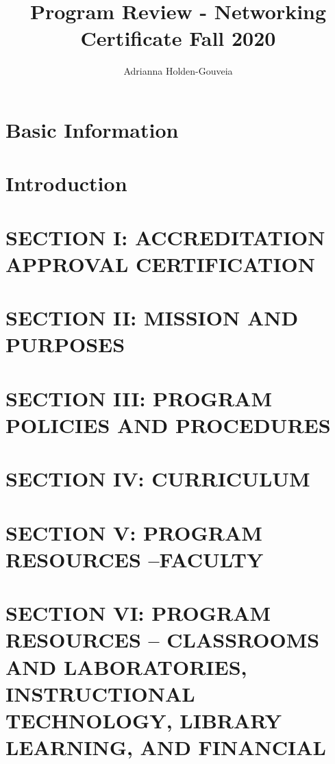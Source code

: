 \documentclass[12pt,a4paper,man,natbib,donotrepeattitle, book]{apa6}
\title{Program Review - Networking Certificate Fall 2020}
\author{Adrianna Holden-Gouveia}
\affiliation{Northern Essex Community College}
\begin{document}
\maketitle
\doublespacing
\tableofcontents

\newpage
\section{Basic Information}


\section{Introduction}
%

\section{SECTION I: ACCREDITATION APPROVAL CERTIFICATION}
%


\section{SECTION II: MISSION AND PURPOSES}
%

\section{SECTION III: PROGRAM POLICIES AND PROCEDURES}
%

\section{SECTION IV: CURRICULUM}
%

\section{SECTION V: PROGRAM RESOURCES –FACULTY}
%

\section{SECTION VI: PROGRAM RESOURCES – CLASSROOMS AND LABORATORIES, INSTRUCTIONAL TECHNOLOGY, LIBRARY LEARNING, AND FINANCIAL}
%
\end{document}
